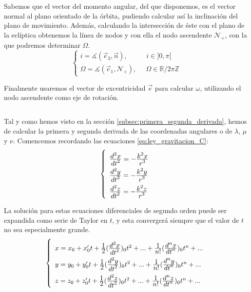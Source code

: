 \documentclass[11pt]{article}
\newcommand\ddfrac[2]{\frac{\displaystyle #1}{\displaystyle #2}}
\begin{document}
Sabemos que el vector del momento angular, del que disponemos, es el vector normal al plano orientado de la órbita, pudiendo calcular así la inclinación del plano de movimiento. Además, calculando la intersección de éste con el plano de la eclíptica obtenemos la línea de nodos y con ella el nodo ascendente $\mathcal{N}_+$, con la que podremos determinar $\Omega$.
\[
\left\{
\begin{array}{l}
	i=\measuredangle(\vec{e}_3,\vec{n}), \; \; \; \; \; \; \; \; \; \; i\in]0,\pi[\\
	\Omega=\measuredangle(\vec{e}_1, \mathcal{N}_+), \; \; \; \; \; \Omega\in\mathbb{R}/2\pi\mathbb{Z}
\end{array}
\right.
\]

Finalmente usaremos el vector de excentricidad $\vec{e}$ para calcular $\omega$, utilizando el nodo ascendente como eje de rotación.\\

\subsection{}
\label{subsec:series_potencias}
Tal y como hemos visto en la sección \ref{subsec:primera_segunda_derivada}, hemos de calcular la primera y segunda derivada de las coordenadas angulares o de $\lambda$, $\mu$ y $\nu$. Comencemos recordando las ecuaciones \eqref{eq:ley_gravitacion_C}:
\begin{align}
\left\{
\def\arraystretch{2}
\begin{array}{l}
	\ddfrac{d^2x}{dt^2}=-\ddfrac{k^2x}{r^3}\\
	\ddfrac{d^2y}{dt^2}=-\ddfrac{k^2y}{r^3}\\
	\ddfrac{d^2z}{dt^2}=-\ddfrac{k^2z}{r^3}
\end{array}
\right.
\label{eq:ley_gravitacion_C_2}
\end{align}

La solución para estas ecuaciones diferenciales de segundo orden puede ser expandida como serie de Taylor en $t$, y esta convergerá siempre que el valor de $t$ no sea especialmente grande.
\begin{align}
\left\{
\def\arraystretch{2}
\begin{array}{l}
	x=x_0+x_0't+\ddfrac{1}{2}(\ddfrac{d^2x}{dt^2})_0t^2+...+\ddfrac{1}{n!}(\ddfrac{d^nx}{dt^n})_0t^n+...\\
	y=y_0+y_0't+\ddfrac{1}{2}(\ddfrac{d^2y}{dt^2})_0t^2+...+\ddfrac{1}{n!}(\ddfrac{d^ny}{dt^n})_0t^n+...\\
	z=z_0+z_0't+\ddfrac{1}{2}(\ddfrac{d^2z}{dt^2})_0t^2+...+\ddfrac{1}{n!}(\ddfrac{d^nz}{dt^n})_0t^n+...\\	
\end{array}
\right.
\label{eq:series_taylor}
\end{align}
\end{document}
